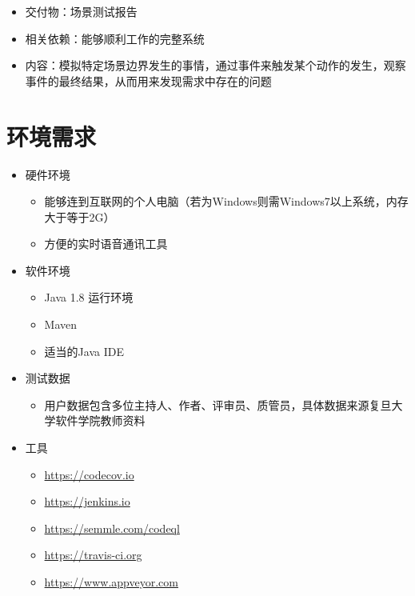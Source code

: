 \documentclass[hyperref, a4paper]{ctexart}
\providecommand{\tightlist}{%
  \setlength{\itemsep}{0pt}\setlength{\parskip}{0pt}}
\begin{document}
\begin{itemize}
\tightlist
\item
  交付物：场景测试报告
\item
  相关依赖：能够顺利工作的完整系统
\item
  内容：模拟特定场景边界发生的事情，通过事件来触发某个动作的发生，观察事件的最终结果，从而用来发现需求中存在的问题
\end{itemize}

\hypertarget{ux73afux5883ux9700ux6c42}{%
\section{环境需求}\label{ux73afux5883ux9700ux6c42}}

\begin{itemize}
\tightlist
\item
  硬件环境

  \begin{itemize}
  \tightlist
  \item
    能够连到互联网的个人电脑（若为Windows则需Windows7以上系统，内存大于等于2G）
  \item
    方便的实时语音通讯工具
  \end{itemize}
\item
  软件环境

  \begin{itemize}
  \tightlist
  \item
    Java 1.8 运行环境
  \item
    Maven
  \item
    适当的Java IDE
  \end{itemize}
\item
  测试数据

  \begin{itemize}
  \tightlist
  \item
    用户数据包含多位主持人、作者、评审员、质管员，具体数据来源复旦大学软件学院教师资料
  \end{itemize}
\item
  工具

  \begin{itemize}
  \tightlist
  \item
    \url{https://codecov.io}
  \item
    \url{https://jenkins.io}
  \item
    \url{https://semmle.com/codeql}
  \item
    \url{https://travis-ci.org}
  \item
    \url{https://www.appveyor.com}
  \end{itemize}
\end{itemize}
\end{document}
